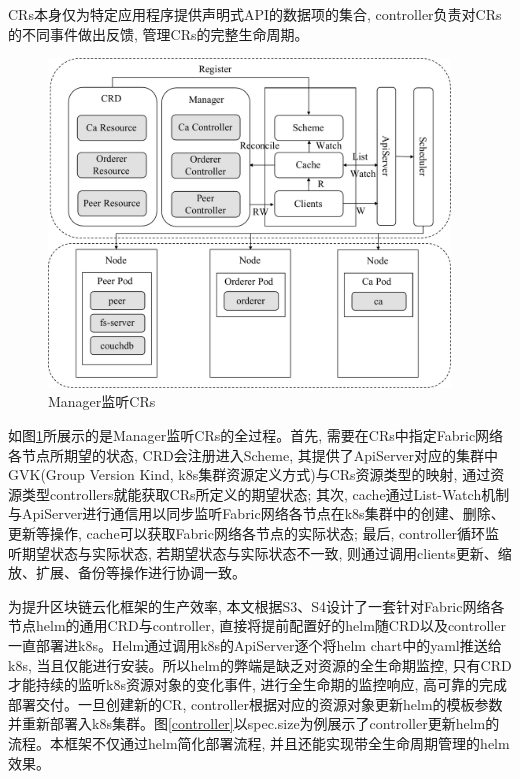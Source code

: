 CRs本身仅为特定应用程序提供声明式API的数据项的集合, controller负责对CRs的不同事件做出反馈, 管理CRs的完整生命周期。

\begin{figure}[h] %
    \centering %
    \includegraphics[width=0.95\textwidth]{FIGs/chapter3/manager.pdf} %
    \caption{Manager监听CRs} %
    \label{manager} %
\end{figure}%

如图\ref{manager}所展示的是Manager监听CRs的全过程。首先, 需要在CRs中指定Fabric网络各节点所期望的状态, CRD会注册进入Scheme, 其提供了ApiServer对应的集群中GVK(Group Version Kind, k8s集群资源定义方式)与CRs资源类型的映射, 通过资源类型controllers就能获取CRs所定义的期望状态; 其次, cache通过List-Watch机制与ApiServer进行通信用以同步监听Fabric网络各节点在k8s集群中的创建、删除、更新等操作, cache可以获取Fabric网络各节点的实际状态; 最后, controller循环监听期望状态与实际状态, 若期望状态与实际状态不一致, 则通过调用clients更新、缩放、扩展、备份等操作进行协调一致。

为提升区块链云化框架的生产效率, 本文根据S3、S4设计了一套针对Fabric网络各节点helm的通用CRD与controller, 直接将提前配置好的helm随CRD以及controller一直部署进k8s。Helm通过调用k8s的ApiServer逐个将helm chart中的yaml推送给k8s, 当且仅能进行安装。所以helm的弊端是缺乏对资源的全生命期监控, 只有CRD才能持续的监听k8s资源对象的变化事件, 进行全生命期的监控响应, 高可靠的完成部署交付。一旦创建新的CR, controller根据对应的资源对象更新helm的模板参数并重新部署入k8s集群。图\ref{controller}以spec.size为例展示了controller更新helm的流程。本框架不仅通过helm简化部署流程, 并且还能实现带全生命周期管理的helm效果。

